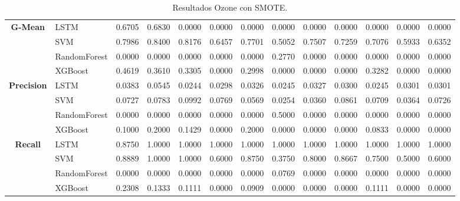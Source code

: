 \begin{table}[h]
\begin{adjustbox}{max width=15cm}
\begin{tabular}{|c|l|r|r|r|r|r|r|r|r|r|r|r|}
			\hline
			\textbf{G-Mean} & LSTM &  0.6705 &  0.6830 &  0.0000 &  0.0000 &  0.0000 &  0.0000 &  0.0000 &  0.0000 &  0.0000 &  0.0000 &  0.0000 \\
			& SVM &  0.7986 &  0.8400 &  0.8176 &  0.6457 &  0.7701 &  0.5052 &  0.7507 &  0.7259 &  0.7076 &  0.5933 &  0.6352 \\
			& RandomForest &  0.0000 &  0.0000 &  0.0000 &  0.0000 &  0.0000 &  0.2770 &  0.0000 &  0.0000 &  0.0000 &  0.0000 &  0.0000 \\
			& XGBoost &  0.4619 &  0.3610 &  0.3305 &  0.0000 &  0.2998 &  0.0000 &  0.0000 &  0.0000 &  0.3282 &  0.0000 &  0.0000 \\
			\hline
			\textbf{Precision} & LSTM &  0.0383 &  0.0545 &  0.0244 &  0.0298 &  0.0326 &  0.0245 &  0.0327 &  0.0300 &  0.0245 &  0.0301 &  0.0301 \\
			& SVM &  0.0727 &  0.0783 &  0.0992 &  0.0769 &  0.0569 &  0.0254 &  0.0360 &  0.0861 &  0.0709 &  0.0364 &  0.0726 \\
			& RandomForest &  0.0000 &  0.0000 &  0.0000 &  0.0000 &  0.0000 &  0.5000 &  0.0000 &  0.0000 &  0.0000 &  0.0000 &  0.0000 \\
			& XGBoost &  0.1000 &  0.2000 &  0.1429 &  0.0000 &  0.2000 &  0.0000 &  0.0000 &  0.0000 &  0.0833 &  0.0000 &  0.0000 \\
			\hline
			\textbf{Recall} & LSTM &  0.8750 &  1.0000 &  1.0000 &  1.0000 &  1.0000 &  1.0000 &  1.0000 &  1.0000 &  1.0000 &  1.0000 &  1.0000 \\
			& SVM &  0.8889 &  1.0000 &  1.0000 &  0.6000 &  0.8750 &  0.3750 &  0.8000 &  0.8667 &  0.7500 &  0.5000 &  0.6000 \\
			& RandomForest &  0.0000 &  0.0000 &  0.0000 &  0.0000 &  0.0000 &  0.0769 &  0.0000 &  0.0000 &  0.0000 &  0.0000 &  0.0000 \\
			& XGBoost &  0.2308 &  0.1333 &  0.1111 &  0.0000 &  0.0909 &  0.0000 &  0.0000 &  0.0000 &  0.1111 &  0.0000 &  0.0000 \\
			\hline
		\end{tabular}
	\end{adjustbox}
	\caption{Resultados Ozone con SMOTE.}
	\label{tab:Ozone_SMOTE}
\end{table}

